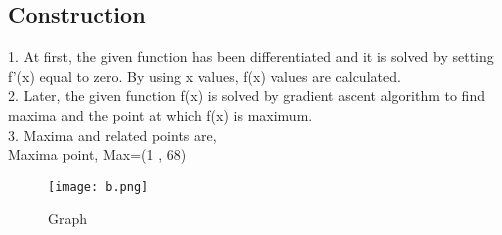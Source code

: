 \documentclass[10pt,twocolumn]{article}
\begin{document}
\begin{flushleft}
\section{Construction}
\end{flushleft}

\begin{flushleft}
1. At first, the given function has been differentiated and it is solved by setting f'(x) equal to zero. By using x values, f(x) values are calculated.\\
\vspace{0.25cm}
2. Later, the given function f(x) is solved by gradient ascent algorithm to find maxima and the point at which f(x) is maximum.\\
\vspace{0.25cm}
3. Maxima and related points are, \\
\vspace{0.25cm}
\center
Maxima point, Max=(1 , 68) 
\end{flushleft}

\begin{figure}[h]
\texttt{[image: b.png]}
\caption{Graph}
\label{fig:Graph}
\end{figure}
\end{document}
